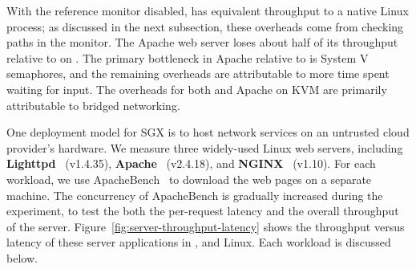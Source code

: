 With the reference monitor disabled,  \lighttpd{} has equivalent throughput to a native Linux process;
as discussed in the next subsection, these overheads come from checking paths in the monitor.
The Apache web server loses about half of its throughput relative to \lighttpd{} on \graphene{}.
The primary bottleneck in Apache relative to \lighttpd{} is System V semaphores,
and the remaining overheads are attributable to more time spent waiting for input.
The overheads for both \lighttpd{} and Apache on KVM are primarily attributable
to bridged networking.


One deployment model for SGX is to host network services
on an untrusted cloud provider's hardware.
We measure three widely-used Linux web servers, including {\bf Lighttpd}~\cite{lighttpd} (v1.4.35), {\bf Apache}~\cite{apache} (v2.4.18), and {\bf NGINX}~\cite{nginx} (v1.10).
For each workload, we use ApacheBench~\cite{apachebench} to download the web pages on a separate machine.
The concurrency of ApacheBench is gradually increased during the experiment, to test the both the per-request latency and the overall throughput of the server.
Figure~\ref{fig:server-throughput-latency} shows the throughput versus latency of these server applications
in \graphenesgx{}, \graphene{} and Linux. 
Each workload is discussed below.




